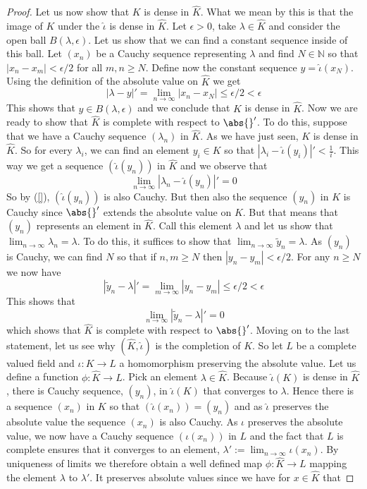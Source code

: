 \documentclass{article}
\newcommand{\mbb}[1]{\mathbb{#1}}
\begin{document}
\begin{proof}
    Let us now show that $K$ is dense in $\hat K$. What we mean by this is that the image of $K$ under the $\hat \iota$ is dense in $\hat K$. Let $\epsilon > 0$, take $\lambda \in \hat K$ and consider the open ball $B(\lambda, \epsilon)$. Let us show that we can find a constant sequence inside of this ball. Let $(x_n)$ be a Cauchy sequence representing $\lambda$ and find $N \in \mbb N$ so that $|x_n - x_m| < \epsilon / 2$ for all $m,n \geq N$. Define now the constant sequence $y = \hat \iota (x_N)$. Using the definition of the absolute value on $\hat K$ we get
    $$|\lambda - y|' = \lim_{n \to \infty} |x_n - x_N| \leq \epsilon/2 < \epsilon$$
    This shows that $y \in B(\lambda, \epsilon)$ and we conclude that $K$ is dense in $\hat K$. Now we are ready to show that $\hat K$ is complete with respect to $\abs{}'$. To do this, suppose that we have a Cauchy sequence $(\lambda_n)$ in $\hat K$. As we have just seen, $K$ is dense in $\hat K$. So for every $\lambda_i$, we can find an element $y_i \in K$ so that $|\lambda_i - \hat \iota (y_i)|' < \frac{1}{i}$. This way we get a sequence $(\hat \iota (y_n))$ in $\hat K$ and we observe that
    $$\lim_{n \to \infty} |\lambda_n - \hat \iota(y_n)|' = 0$$
    So by (\ref{}), $(\hat \iota (y_n))$ is also Cauchy. But then also the sequence $(y_n)$ in $K$ is Cauchy since $\abs{}'$ extends the absolute value on $K$. But that means that $(y_n)$ represents an element in $\hat K$. Call this element $\lambda$ and let us show that $\lim_{n \to \infty} \lambda_n = \lambda$. To do this, it suffices to show that $\lim_{n \to \infty} \tilde y_n = \lambda$. As $(y_n)$ is Cauchy, we can find $N$ so that if $n,m \geq N$ then $|y_n - y_m| < \epsilon / 2$. For any $n \geq N$ we now have
    $$|\tilde y_n - \lambda|' = \lim_{m \to \infty} |y_n - y_m| \leq \epsilon / 2 < \epsilon$$
    This shows that
    $$\lim_{n \to \infty} |\tilde y_n - \lambda|' = 0$$
    which shows that $\hat K$ is complete with respect to $\abs{}'$. Moving on to the last statement, let us see why $(\hat K, \hat \iota)$ is the completion of $K$. So let $L$ be a complete valued field and $\iota : K \to L$ a homomorphism preserving the absolute value. Let us define a function $\phi : \hat K \to L$. Pick an element $\lambda \in \hat K$. Because $\hat \iota (K)$ is dense in $\hat K$, there is Cauchy sequence, $(y_n)$, in $\hat \iota (K)$ that converges to $\lambda$. Hence there is a sequence $(x_n)$ in $K$ so that $(\hat \iota(x_n)) = (y_n)$ and as $\hat \iota$ preserves the absolute value the sequence $(x_n)$ is also Cauchy. As $\iota$ preserves the absolute value, we now have a Cauchy sequence $(\iota(x_n))$ in $L$ and the fact that $L$ is complete ensures that it converges to an element, $\lambda' := \lim_{n \to \infty} \iota(x_n)$. By uniqueness of limits we therefore obtain a well defined map $\phi : \hat K \to L$ mapping the element $\lambda$ to $\lambda'$. It preserves absolute values since we have for $x \in \hat K$ that 

\end{proof}
\end{document}
